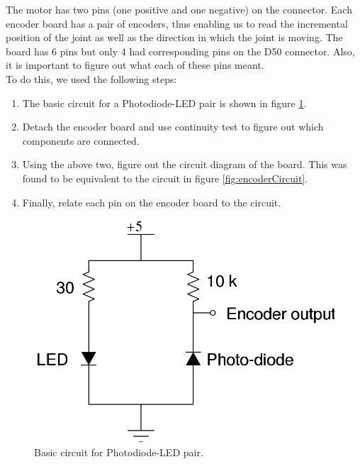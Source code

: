 \documentclass[10pt,a4paper]{article}
\begin{document}
The motor has two pins (one positive and one negative) on the
connector. Each encoder board has a pair of encoders, thus enabling us
to read the incremental position of the joint as well as the direction
in which the joint is moving. The board has 6 pins but only 4 had
corresponding pins on the D50 connector. Also, it is important to
figure out what each of these pins meant.\\

To do this, we used the following steps:
\begin{enumerate}
\item The basic circuit for a Photodiode-LED pair is shown in figure
  \ref{fig:photodiodeLEDPair}. 
\item Detach the encoder board and use continuity test to figure out
  which components are connected.
\item Using the above two, figure out the circuit diagram of the
  board. This was found to be equivalent to the circuit in figure
  \ref{fig:encoderCircuit}. 
\item Finally, relate each pin on the encoder board to the
  circuit. 
\end{enumerate}

\begin{figure}[h]
    \centering
    \includegraphics[scale=0.5]{SimpleEncoder.jpg}
    \caption{Basic circuit for Photodiode-LED pair.}
    \label{fig:photodiodeLEDPair}
\end{figure}
\end{document}
